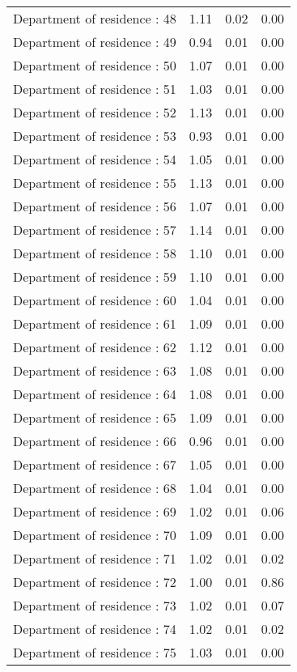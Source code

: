 \documentclass[risks,article,submit,moreauthors,pdftex]{Definitions/mdpi}
\begin{document}
\begin{longtable}{lrrr}
Department of residence : 48 & 1.11 & 0.02 & 0.00 \\ 
Department of residence : 49 & 0.94 & 0.01 & 0.00 \\ 
Department of residence : 50 & 1.07 & 0.01 & 0.00 \\ 
Department of residence : 51 & 1.03 & 0.01 & 0.00 \\ 
Department of residence : 52 & 1.13 & 0.01 & 0.00 \\ 
Department of residence : 53 & 0.93 & 0.01 & 0.00 \\ 
Department of residence : 54 & 1.05 & 0.01 & 0.00 \\ 
Department of residence : 55 & 1.13 & 0.01 & 0.00 \\ 
Department of residence : 56 & 1.07 & 0.01 & 0.00 \\ 
Department of residence : 57 & 1.14 & 0.01 & 0.00 \\ 
Department of residence : 58 & 1.10 & 0.01 & 0.00 \\ 
Department of residence : 59 & 1.10 & 0.01 & 0.00 \\ 
Department of residence : 60 & 1.04 & 0.01 & 0.00 \\ 
Department of residence : 61 & 1.09 & 0.01 & 0.00 \\ 
Department of residence : 62 & 1.12 & 0.01 & 0.00 \\ 
Department of residence : 63 & 1.08 & 0.01 & 0.00 \\ 
Department of residence : 64 & 1.08 & 0.01 & 0.00 \\ 
Department of residence : 65 & 1.09 & 0.01 & 0.00 \\ 
Department of residence : 66 & 0.96 & 0.01 & 0.00 \\ 
Department of residence : 67 & 1.05 & 0.01 & 0.00 \\ 
Department of residence : 68 & 1.04 & 0.01 & 0.00 \\ 
Department of residence : 69 & 1.02 & 0.01 & 0.06 \\ 
Department of residence : 70 & 1.09 & 0.01 & 0.00 \\ 
Department of residence : 71 & 1.02 & 0.01 & 0.02 \\ 
Department of residence : 72 & 1.00 & 0.01 & 0.86 \\ 
Department of residence : 73 & 1.02 & 0.01 & 0.07 \\ 
Department of residence : 74 & 1.02 & 0.01 & 0.02 \\ 
Department of residence : 75 & 1.03 & 0.01 & 0.00 \\ 

\end{longtable}
\end{document}
